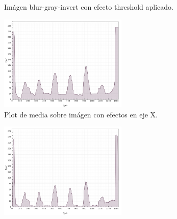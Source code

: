 \begin{itemize}
\begin{figure}[H]
	  \centering
	  \centering
	  \vspace{-0.4cm}
	  \caption{Im\'agen blur-gray-invert con efecto threshold aplicado.}
	  \label{fig:font-thresh}
	  \vspace{-0.15cm}
	\end{figure}
	\begin{figure}[H]
	  \vspace{-0.2cm}
	  \centering
	  \includegraphics[width=230px]{imagenes-jtlc/experimento/search-cut-points/plot-x}
	  \centering
	  \vspace{-0.4cm}
	  \caption{Plot de media sobre im\'agen con efectos en eje X.}
	  \label{fig:font-sc-plot-x}
	  \vspace{-0.15cm}
	\end{figure}
	\begin{figure}[H]
	  \vspace{-0.2cm}
	  \centering
	  \includegraphics[width=230px]{imagenes-jtlc/experimento/search-cut-points/plot-x-no-blur}

\end{figure}
\end{itemize}
